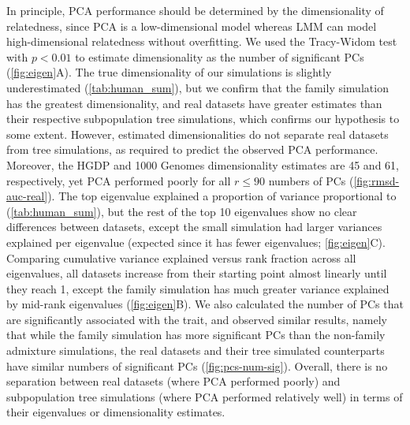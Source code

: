\documentclass[11pt]{article}
\begin{document}
\begin{linenumbers}
In principle, PCA performance should be determined by the dimensionality of relatedness, since PCA is a low-dimensional model whereas LMM can model high-dimensional relatedness without overfitting.
We used the Tracy-Widom test \citep{patterson_population_2006} with $p < 0.01$ to estimate dimensionality as the number of significant PCs (\cref{fig:eigen}A).
The true dimensionality of our simulations is slightly underestimated (\cref{tab:human_sum}), but we confirm that the family simulation has the greatest dimensionality, and real datasets have greater estimates than their respective subpopulation tree simulations, which confirms our hypothesis to some extent.
However, estimated dimensionalities do not separate real datasets from tree simulations, as required to predict the observed PCA performance.
Moreover, the HGDP and 1000 Genomes dimensionality estimates are 45 and 61, respectively, yet PCA performed poorly for all $r \le 90$ numbers of PCs (\cref{fig:rmsd-auc-real}).
The top eigenvalue explained a proportion of variance proportional to \Fst (\cref{tab:human_sum}), but the rest of the top 10 eigenvalues show no clear differences between datasets, except the small simulation had larger variances explained per eigenvalue (expected since it has fewer eigenvalues; \cref{fig:eigen}C).
Comparing cumulative variance explained versus rank fraction across all eigenvalues, all datasets increase from their starting point almost linearly until they reach 1, except the family simulation has much greater variance explained by mid-rank eigenvalues (\cref{fig:eigen}B).
We also calculated the number of PCs that are significantly associated with the trait, and observed similar results, namely that while the family simulation has more significant PCs than the non-family admixture simulations, the real datasets and their tree simulated counterparts have similar numbers of significant PCs (\cref{fig:pcs-num-sig}).
Overall, there is no separation between real datasets (where PCA performed poorly) and subpopulation tree simulations (where PCA performed relatively well) in terms of their eigenvalues or dimensionality estimates.


\end{linenumbers}
\end{document}
